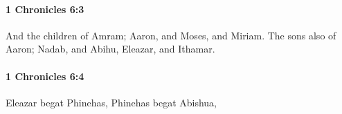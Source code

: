 		\paragraph{1 Chronicles 6:3} %
			\label{1CHRONICLES-6-3}

			And the children of Amram; Aaron, and Moses, and Miriam. The sons also of Aaron; Nadab, and Abihu, Eleazar, and Ithamar.


		\paragraph{1 Chronicles 6:4} %
			\label{1CHRONICLES-6-4}

			Eleazar begat Phinehas, Phinehas begat Abishua,


